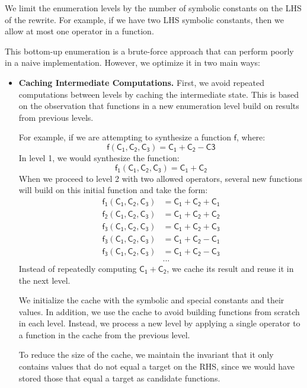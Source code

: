 \documentclass[review, anonymous, acmsmall]{acmart}
\newcommand{\blockmath}[1]{\[\mathsf{#1}\]}
\newcommand{\inline}[1]{$\mathsf{#1}$}
\begin{document}
We limit the enumeration levels by the number of symbolic constants on the LHS of the rewrite.  For example, if we have two LHS symbolic constants, then we allow at most one operator in a function. 

This bottom-up enumeration is a brute-force approach that can perform poorly in a naive implementation. However, we optimize it in two main ways:

\begin{itemize}
    \item \textbf{Caching Intermediate Computations.} First, we avoid repeated computations between levels by caching the intermediate state. This is based on the observation that functions in a new enumeration level build on results from previous levels. 
    
    For example, if we are attempting to synthesize a function \inline{f}, where:
                    \blockmath{f(C_1, C_2, C_3) = C_1 + C_2  - C3}
    In level 1, we would synthesize the function:
        \blockmath{f_1(C_1, C_2, C_3) = C_1 + C_2}
    When we proceed to level 2 with two allowed operators, several new functions will build on this initial function and take the form:
        \begin{align*}
            \mathsf{f_{1}(C_1, C_2, C_3)} &= \mathsf{C_1 + C_2 + C_1} \\
            \mathsf{f_{2}(C_1, C_2, C_3)} &= \mathsf{C_1 + C_2 + C_2} \\
            \mathsf{f_{3}(C_1, C_2, C_3)} &= \mathsf{C_1 + C_2 + C_3} \\
            \mathsf{f_{3}(C_1, C_2, C_3)} &= \mathsf{C_1 + C_2 - C_1} \\
            \mathsf{f_{3}(C_1, C_2, C_3)} &= \mathsf{C_1 + C_2 - C_3} \\
            &...
        \end{align*}
    Instead of repeatedly computing \inline{C_1 + C_2}, we cache its result and reuse it in the next level. 
    
    We initialize the cache with the symbolic and special constants and their values. In addition, we use the cache to avoid building functions from scratch in each level. Instead, we process a new level by applying a single operator to a function in the cache from the previous level. 
    
   To reduce the size of the cache, we maintain the invariant that it only contains values that do not equal a target on the RHS, since we would have stored those that equal a target as candidate functions.
    

\end{itemize}
\end{document}
